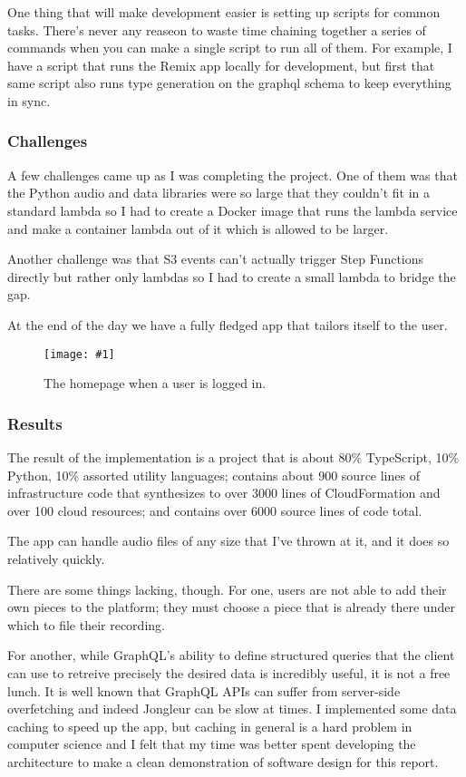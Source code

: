 \documentclass{article}
\newcommand{\screenshot}[2]{
  \begin{figure}[h]
    \texttt{[image: \#1]}
    \caption*{#2}
  \end{figure}
}
\begin{document}
One thing that will make development easier is setting up scripts for common tasks.
There's never any reaseon to waste time chaining together a series of commands when you can make a single script to run all of them.
For example, I have a script that runs the Remix app locally for development, but first that same script also runs type generation on the graphql schema to keep everything in sync.

\subsubsection{Challenges}

A few challenges came up as I was completing the project.
One of them was that the Python audio and data libraries were so large that they couldn't fit in a standard lambda so I had to create a Docker image that runs the lambda service and make a container lambda out of it which is allowed to be larger.

Another challenge was that S3 events can't actually trigger Step Functions directly but rather only lambdas so I had to create a small lambda to bridge the gap.

At the end of the day we have a fully fledged app that tailors itself to the user.

\screenshot{jong-home-in}{The homepage when a user is logged in.}

\subsubsection{Results}

The result of the implementation is a project that is about 80\% TypeScript, 10\% Python, 10\% assorted utility languages; contains about 900 source lines of infrastructure code that synthesizes to over 3000 lines of CloudFormation and over 100 cloud resources; and contains over 6000 source lines of code total.

The app can handle audio files of any size that I've thrown at it, and it does so relatively quickly.

There are some things lacking, though.
For one, users are not able to add their own pieces to the platform; they must choose a piece that is already there under which to file their recording.

For another, while GraphQL's ability to define structured queries that the client can use to retreive precisely the desired data is incredibly useful, it is not a free lunch.
It is well known that GraphQL APIs can suffer from server-side overfetching and indeed Jongleur can be slow at times.
I implemented some data caching to speed up the app, but caching in general is a hard problem in computer science and I felt that my time was better spent developing the architecture to make a clean demonstration of software design for this report.
\end{document}
